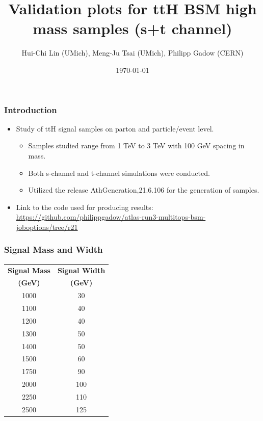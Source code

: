 \documentclass{beamer}
\begin{document}
\begin{frame}
\title{Validation plots for ttH BSM high mass samples (s+t channel)}
\author{Hui-Chi Lin (UMich), Meng-Ju Tsai (UMich), Philipp Gadow (CERN)}
\date{\today}
\maketitle
\end{frame}
\begin{frame}
\frametitle{Introduction}
\begin{itemize}
\item Study of ttH signal samples on parton and particle/event level.
\begin{itemize}
\item Samples studied range from 1 TeV to 3 TeV with 100 GeV spacing in mass.
\item Both s-channel and t-channel simulations were conducted.
\item Utilized the release AthGeneration,21.6.106 for the generation of samples.
\end{itemize}
\item Link to the code used for producing results: \url{https://github.com/philippgadow/atlas-run3-multitops-bsm-joboptions/tree/r21}
\end{itemize}
\end{frame}
\begin{frame}
\frametitle{Signal Mass and Width}
\begin{table}
\begin{tabular}{cc}
\textbf{Signal Mass} & \textbf{Signal Width} \\
\textbf{(GeV)} & \textbf{(GeV)} \\
1000 & 30 \\
1100 & 40 \\
1200 & 40 \\
1300 & 50 \\
1400 & 50 \\
1500 & 60 \\
1750 & 90 \\
2000 & 100 \\
2250 & 110 \\
2500 & 125 \\
\end{tabular}
\end{table}
\end{frame}
\end{document}
